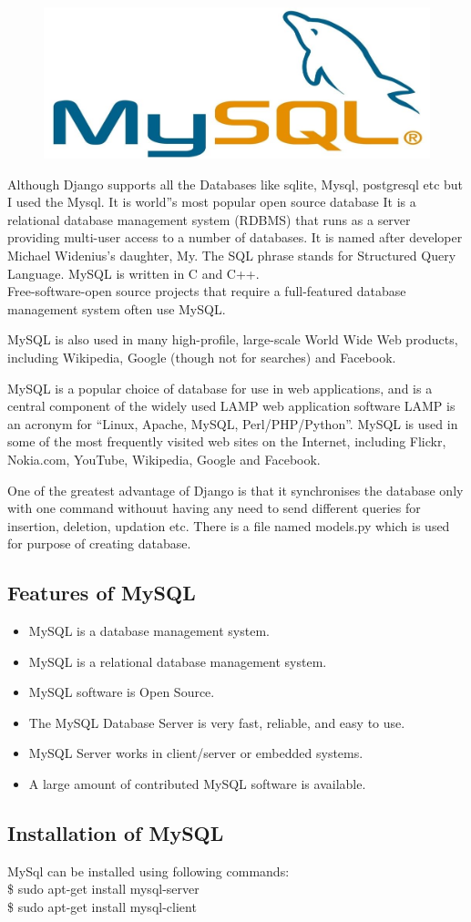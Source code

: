 \begin{figure}[h]
\centering \includegraphics[scale=0.2]{images/mysql.jpg}
\end{figure}
\noindent Although Django supports all the Databases like sqlite, Mysql, postgresql etc 
but I used the Mysql. It is world''s most popular open source database It 
is a relational database management system (RDBMS) that runs as a server 
providing multi-user access to a number of databases. It is named after 
developer Michael Widenius's daughter, My. The SQL phrase stands for
Structured Query Language. MySQL is written in C and C++.\\
         Free-software-open source projects that require a 
full-featured database management system
often use MySQL.

MySQL is also used in many high-profile, large-scale World 
Wide Web products, including
Wikipedia, Google (though not for searches) and Facebook.

MySQL is a popular choice of database for use in web 
applications, and is a central component of the widely used LAMP web 
application software LAMP is an acronym for “Linux, Apache, MySQL, 
Perl/PHP/Python”.
         MySQL is used in some of the most frequently visited web sites 
on the Internet, including Flickr, Nokia.com, YouTube, Wikipedia, Google 
and Facebook.

One of the greatest advantage of Django is that it synchronises the 
database only with one command withouut having any need to send 
different queries for insertion, deletion, updation etc. There is a 
file named models.py which is used for purpose of creating database.
\subsection{Features of MySQL}
\begin{itemize}
\item MySQL is a database management system.
\item MySQL is a relational database management system.
\item MySQL software is Open Source.
\item The MySQL Database Server is very fast, reliable, and easy to 
use.
\item MySQL Server works in client/server or embedded systems.
\item A large amount of contributed MySQL software is available.
\end{itemize}
\subsection{Installation of MySQL}
MySql can be installed using following commands:\\

\hspace{4pt} \$ sudo apt-get install mysql-server\\

\hspace{4pt} \$ sudo apt-get install mysql-client
\newpage
